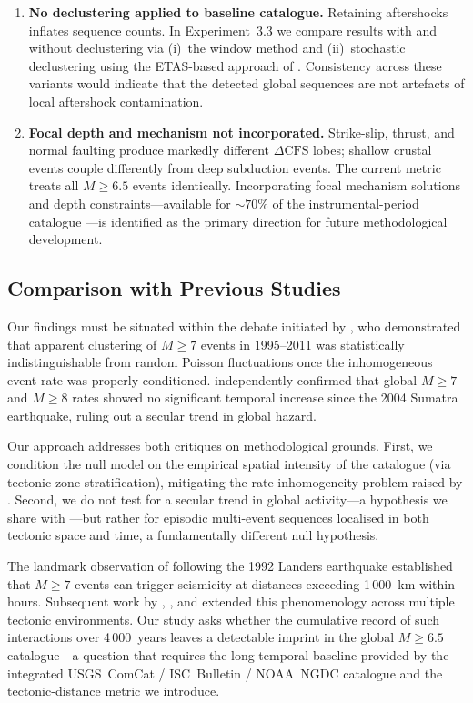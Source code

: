 \begin{enumerate}
\item \textbf{No declustering applied to baseline catalogue.}
Retaining aftershocks inflates sequence counts.  In Experiment~3.3 we
compare results with and without declustering via (i)~the
\citet{Gardner1974} window method and (ii)~stochastic declustering using
the ETAS-based approach of \citet{Zhuang2002}.  Consistency across
these variants would indicate that the detected global sequences are not
artefacts of local aftershock contamination.

\item \textbf{Focal depth and mechanism not incorporated.}
Strike-slip, thrust, and normal faulting produce markedly different
$\Delta\mathrm{CFS}$ lobes; shallow crustal events couple differently
from deep subduction events.  The current metric treats all $M \geq 6.5$
events identically.  Incorporating focal mechanism solutions and depth
constraints—available for $\sim\!70\%$ of the instrumental-period
catalogue \citep{Engdahl1998}—is identified as the primary direction for
future methodological development.

\end{enumerate}

\subsection{Comparison with Previous Studies}
\label{subsec:comparison}

Our findings must be situated within the debate initiated by
\citet{Michael2011}, who demonstrated that apparent clustering of $M \geq
7$ events in 1995–2011 was statistically indistinguishable from random
Poisson fluctuations once the inhomogeneous event rate was properly
conditioned.  \citet{ShearerStark2012} independently confirmed that
global $M \geq 7$ and $M \geq 8$ rates showed no significant temporal
increase since the 2004 Sumatra earthquake, ruling out a secular trend in
global hazard.

Our approach addresses both critiques on methodological grounds.  First,
we condition the null model on the empirical spatial intensity of the
catalogue (via tectonic zone stratification), mitigating the rate
inhomogeneity problem raised by \citet{Michael2011}.  Second, we do not
test for a secular trend in global activity—a hypothesis we share with
\citet{ShearerStark2012}—but rather for episodic multi-event sequences
localised in both tectonic space and time, a fundamentally different null
hypothesis.

The landmark observation of \citet{Hill1993} following the 1992 Landers
earthquake established that $M \geq 7$ events can trigger seismicity at
distances exceeding 1\,000~km within hours.  Subsequent work by
\citet{Brodsky2006}, \citet{Gomberg2001}, and \citet{Parsons2002}
extended this phenomenology across multiple tectonic environments.  Our
study asks whether the cumulative record of such interactions over
4\,000~years leaves a detectable imprint in the global $M \geq 6.5$
catalogue—a question that requires the long temporal baseline provided
by the integrated USGS~ComCat / ISC~Bulletin / NOAA~NGDC catalogue and
the tectonic-distance metric we introduce.

